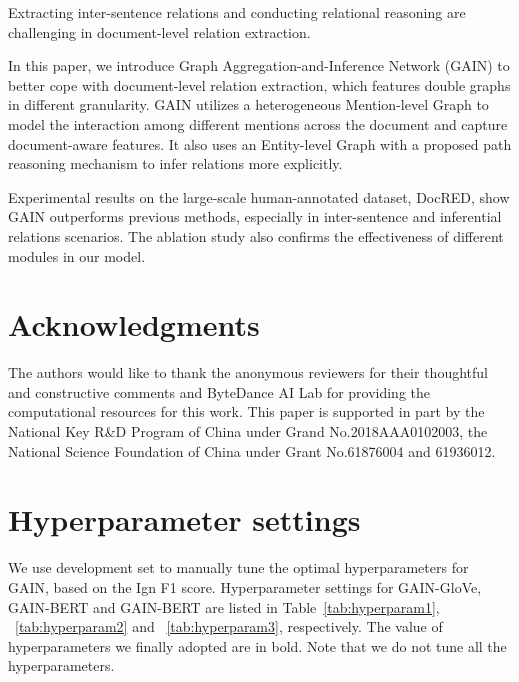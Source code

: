 \documentclass[11pt,a4paper]{article}
\begin{document}
Extracting inter-sentence relations and conducting relational reasoning are challenging in document-level relation extraction. 

In this paper, we introduce Graph Aggregation-and-Inference Network (GAIN) to better cope with document-level relation extraction, which features double graphs in different granularity.
GAIN utilizes a heterogeneous Mention-level Graph to model the interaction among different mentions across the document and capture document-aware features.
It also uses an Entity-level Graph with a proposed path reasoning mechanism to infer relations more explicitly.

Experimental results on the large-scale human-annotated dataset, DocRED, show GAIN outperforms previous methods, especially in inter-sentence and inferential relations scenarios. 
The ablation study also confirms the effectiveness of different modules in our model.
 
\section*{Acknowledgments}
The authors would like to thank the anonymous reviewers for their thoughtful and constructive comments and ByteDance AI Lab for providing the computational resources for this work.
This paper is supported in part by the National Key R\&D Program of China under Grand No.2018AAA0102003, the National Science Foundation of China under Grant No.61876004 and 61936012.




\appendix


\section{Hyperparameter settings\label{sec:appendix}}
We use development set to manually tune the optimal hyperparameters for GAIN, based on the Ign F1 score. Hyperparameter settings for GAIN-GloVe, GAIN-BERT and GAIN-BERT are listed in Table~\ref{tab:hyperparam1}, ~\ref{tab:hyperparam2} and ~\ref{tab:hyperparam3}, respectively. The value of hyperparameters we finally adopted are in bold. Note that we do not tune all the hyperparameters.
\end{document}
